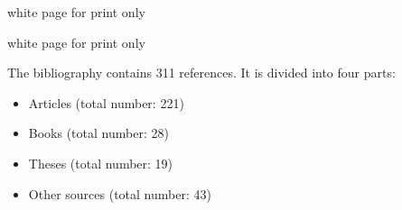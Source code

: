 \documentclass[
							a4paper, 
							11pt, 
							openany, 
							bibtotoc, 
							parskip=half, 
   							headings=normal,
   							bibliography=totoc
						]{scrreprt}
\begin{document}
\newpage

{\color{white} white page for print only}

\newpage






 

 





\thispagestyle{empty}
\tableofcontents
\thispagestyle{empty}
\restoregeometry







\newpage

{\color{white} white page for print only}

\newpage

\setcounter{page}{1}



%
%














\newpage
\thispagestyle{empty}
\mbox{}
\fancyhead[C]{\textsf{  \nouppercase{\leftmark} }}




\printbibheading


The bibliography contains 311 references. It is divided into four parts:

\begin{itemize}
\item Articles (total number: 221)
\item Books (total number: 28)
\item Theses (total number: 19)
\item Other sources (total number: 43)
\end{itemize}
\end{document}
